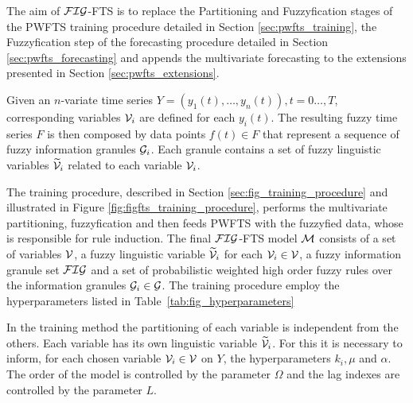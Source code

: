 The aim of $\mathcal{FIG}$-FTS is to replace the Partitioning and Fuzzyfication stages of the PWFTS training procedure detailed in Section \ref{sec:pwfts_training}, the Fuzzyfication step of the forecasting procedure detailed in Section \ref{sec:pwfts_forecasting} and appends the multivariate forecasting to the extensions presented in Section \ref{sec:pwfts_extensions}.

Given an $n$-variate time series $Y=(y_1(t), \ldots,y_n(t)),  t=0\ldots,T$, corresponding variables $\mathcal{V}_i$ are defined for each $y_i(t)$. The resulting fuzzy time series $F$ is then composed by data points $f(t) \in F$ that represent a sequence of fuzzy information granules $\mathcal{G}_i$. Each granule contains a set of fuzzy linguistic variables $\widetilde{\mathcal{V}}_i$ related to each variable $\mathcal{V}_i$.

The training procedure, described in Section \ref{sec:fig_training_procedure} and illustrated in Figure \ref{fig:figfts_training_procedure}, performs the multivariate partitioning, fuzzyfication and then feeds PWFTS with the fuzzyfied data, whose is responsible for rule induction. The final $\mathcal{FIG}$-FTS model $\mathcal{M}$ consists of a set of variables $\mathcal{V}$, a fuzzy linguistic variable $\widetilde{\mathcal{V}}_i$ for each $\mathcal{V}_i \in \mathcal{V}$, a fuzzy information granule set $\mathcal{FIG}$ and a set of probabilistic weighted high order fuzzy rules over the information granules $\mathcal{G}_i \in \mathcal{G}$. The training procedure employ the hyperparameters listed in Table~\ref{tab:fig_hyperparameters}

In the training method the partitioning of each variable is independent from the others. Each variable has its own linguistic variable $\widetilde{\mathcal{V}}_i$. For this it is necessary to inform, for each chosen variable $\mathcal{V}_i \in \mathcal{V}$ on $Y$, the hyperparameters $k_i, \mu$ and $\alpha$. The order of the model is controlled by the parameter $\Omega$ and the lag indexes are controlled by the parameter $L$. 

